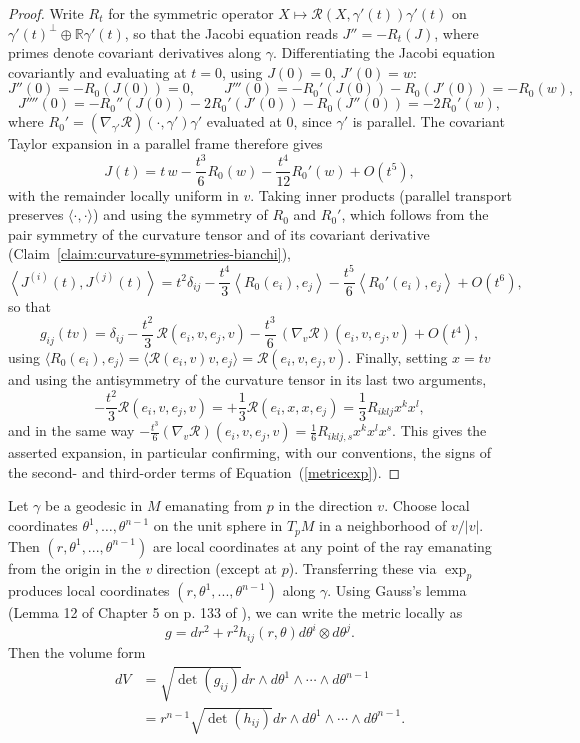 \begin{proof}
Write $R_t$ for the symmetric operator $X\mapsto{\mathcal
R}(X,\gamma'(t))\gamma'(t)$ on $\gamma'(t)^\perp\oplus\mathbb{R}
\gamma'(t)$, so that the Jacobi equation reads $J''=-R_t(J)$, where
primes denote covariant derivatives along $\gamma$. Differentiating
the Jacobi equation covariantly and evaluating at $t=0$, using
$J(0)=0$, $J'(0)=w$:
$$J''(0)=-R_0(J(0))=0,\qquad J'''(0)=-R_0'(J(0))-R_0(J'(0))
=-R_0(w),$$
$$J''''(0)=-R_0''(J(0))-2R_0'(J'(0))-R_0(J''(0))=-2R_0'(w),$$
where $R_0'=\left(\nabla_{\gamma'}{\mathcal
R}\right)(\cdot,\gamma')\gamma'$ evaluated at $0$, since $\gamma'$
is parallel. The covariant Taylor expansion in a parallel frame
therefore gives
$$J(t)=t\,w-\frac{t^3}{6}R_0(w)-\frac{t^4}{12}R_0'(w)+O(t^5),$$
with the remainder locally uniform in $v$. Taking inner products
(parallel transport preserves $\langle\cdot,\cdot\rangle$) and
using the symmetry of $R_0$ and $R_0'$, which follows from the pair
symmetry of the curvature tensor and of its covariant derivative
(Claim~\ref{claim:curvature-symmetries-bianchi}),
$$\left\langle J^{(i)}(t),J^{(j)}(t)\right\rangle
=t^2\delta_{ij}-\frac{t^4}{3}\left\langle
R_0(e_i),e_j\right\rangle-\frac{t^5}{6}\left\langle
R_0'(e_i),e_j\right\rangle+O(t^6),$$
so that
$$g_{ij}(tv)=\delta_{ij}-\frac{t^2}{3}\,{\mathcal
R}(e_i,v,e_j,v)-\frac{t^3}{6}\,\left(\nabla_v{\mathcal
R}\right)(e_i,v,e_j,v)+O(t^4),$$
using $\langle R_0(e_i),e_j\rangle=\langle{\mathcal
R}(e_i,v)v,e_j\rangle={\mathcal R}(e_i,v,e_j,v)$. Finally, setting
$x=tv$ and using the antisymmetry of the curvature tensor in its
last two arguments,
$$-\frac{t^2}{3}{\mathcal R}(e_i,v,e_j,v)
=+\frac13{\mathcal R}(e_i,x,x,e_j)=\frac13R_{iklj}x^kx^l,$$
and in the same way
$-\frac{t^3}{6}(\nabla_v{\mathcal R})(e_i,v,e_j,v)
=\frac16R_{iklj,s}x^kx^lx^s$. This gives the asserted expansion,
in particular confirming, with our conventions, the signs of the
second- and third-order terms of Equation~(\ref{metricexp}).
\end{proof}

Let $\gamma$ be a geodesic in $M$ emanating from $p$ in the direction $v$.
Choose local coordinates $\theta^1,\ldots,\theta^{n-1}$ on the unit sphere in
$T_pM$ in a neighborhood of $v/|v|$. Then $(r, \theta^{1}, ... ,\theta^{n-1})$
are local coordinates at any point of the ray emanating from the origin in the
$v$ direction (except at $p$). Transferring these via $\exp_p$ produces
local coordinates $(r,\theta^{1}, ... ,\theta^{n-1})$ along $\gamma$. Using
Gauss's lemma (Lemma 12 of Chapter 5 on p. 133 of \cite{Petersen}), we can
write the metric locally as
\[ g=dr^{2}+
r^{2}h_{ij}(r,\theta)d\theta^{i}\otimes d\theta^{j}. \] Then the
volume form
\begin{align*}
dV &= \sqrt{\det(g_{ij})}dr\wedge d\theta^{1}
\wedge\cdots\wedge
d\theta^{n-1}\\
& = r^{n-1}\sqrt{\det(h_{ij})}dr\wedge d\theta^{1}
\wedge\cdots\wedge d\theta^{n-1}.
\end{align*}



